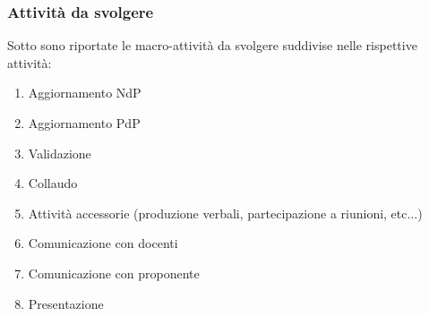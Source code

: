 \subsubsection{Attività da svolgere}
Sotto sono riportate le macro-attività da svolgere suddivise nelle rispettive attività:
\begin{enumerate}
	\item Aggiornamento NdP
	\item Aggiornamento PdP
	\item Validazione
	\item Collaudo
	\item Attività accessorie (produzione verbali, partecipazione a riunioni, etc...)
	\item Comunicazione con docenti
	\item Comunicazione con proponente
	\item Presentazione
\end{enumerate}